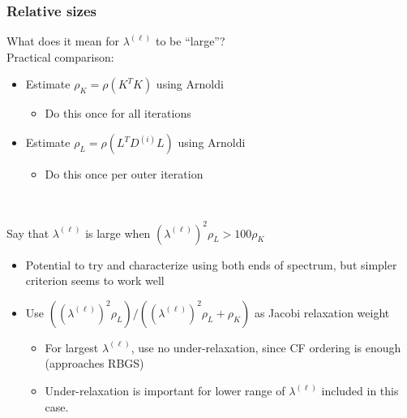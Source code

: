 \documentclass[12pt,t,xcolor=dvipsnames]{beamer}
\begin{document}
\begin{frame}
  \frametitle{Relative sizes}

  What does it mean for $\lambda^{(\ell)}$ to be ``large''? \\[12pt]

  Practical comparison:
  \begin{itemize}
  \item Estimate $\rho_K = \rho(K^TK)$ using Arnoldi
    \begin{itemize}
    \item Do this once for all iterations
    \end{itemize}
  \item Estimate $\rho_L = \rho(L^TD^{(i)}L)$ using Arnoldi
    \begin{itemize}
    \item Do this once per outer iteration
    \end{itemize}
  \end{itemize}
  \ \\[12pt] \pause

  Say that $\lambda^{(\ell)}$ is large when
  $(\lambda^{(\ell)})^2\rho_L > 100\rho_K$
  \begin{itemize}
  \item Potential to try and characterize using both ends of spectrum,
  but simpler criterion seems to work well
  \item Use
    $\left((\lambda^{(\ell)})^2\rho_L\right)/\left((\lambda^{(\ell)})^2\rho_L
    + \rho_K\right)$ as Jacobi relaxation weight
    \begin{itemize}
\item For largest $\lambda^{(\ell)}$, use no under-relaxation, since
  CF ordering is enough (approaches RBGS)
  \item Under-relaxation is important for lower range of
    $\lambda^{(\ell)}$ included in this case.
    \end{itemize}
    
  
  \end{itemize}
  

\end{frame}
\end{document}
